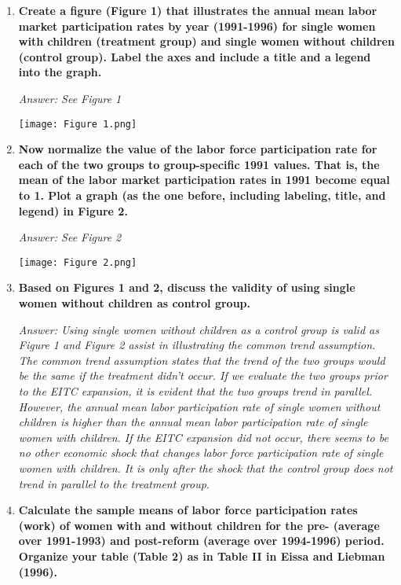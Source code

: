 \documentclass{article}
\begin{document}
\begin{enumerate}
	
	\item \textbf{Create a figure (Figure 1) that illustrates the annual mean labor market participation rates by year (1991-1996) for single women with children (treatment group) and single women without children (control group). Label the axes and include a title and a legend into the graph.}

\textit{Answer: See Figure 1}

\texttt{[image: Figure 1.png]}



\item \textbf{Now normalize the value of the labor force participation rate for each of the two groups to group-specific 1991 values. That is, the mean of the labor market participation rates in 1991 become equal to 1. Plot a graph (as the one before, including labeling, title, and legend) in Figure 2.}

\textit{Answer: See Figure 2}


\texttt{[image: Figure 2.png]}





\item \textbf{Based on Figures 1 and 2, discuss the validity of using single women without children as control group.   }


\textit{Answer: Using single women without children as a control group is valid as Figure 1 and Figure 2 assist in illustrating the common trend assumption. The common trend assumption states that the trend of the two groups would be the same if the treatment didn’t occur. If we evaluate the two groups prior to the EITC expansion, it is evident that the two groups trend in parallel. However, the annual mean labor participation rate of single women without children is higher than the annual mean labor participation rate of single women with children. If the EITC expansion did not occur, there seems to be no other economic shock that changes labor force participation rate of single women with children. It is only after the shock that the control group does not trend in parallel to the treatment group. }



\item \textbf{ Calculate the sample means of labor force participation rates (work) of women with and without children for the pre- (average over 1991-1993) and post-reform (average over 1994-1996) period. Organize your table (Table 2) as in Table II in Eissa and Liebman (1996).  }



\end{enumerate}
\end{document}
